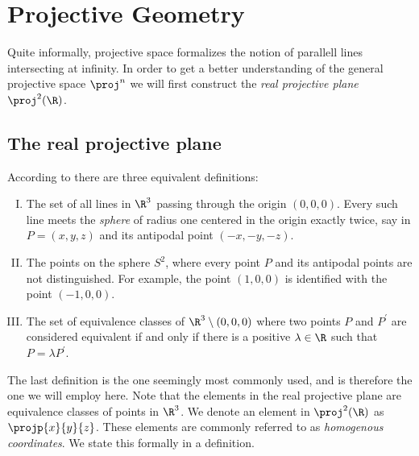\documentclass[a4paper]{article}
\begin{document}
    \section{Projective Geometry}
    \label{sec:projective_geometry}
    
    Quite informally, projective space formalizes the notion of parallell lines
    intersecting at infinity. In order to get a better understanding of the
    general projective space $\proj^n$ we will first construct the \emph{real
    projective plane} $\proj^2(\R)$. 

\subsection{The real projective plane}

    According to \cite{Wik16} there are three equivalent definitions:
    \begin{enumerate}[I.]
        \item\label{def:one} The set of all lines in $\R^3$ passing through the origin $\left( 0,
            0, 0 \right)$. Every such line meets the \emph{sphere} of radius one
            centered in the origin exactly twice, say in $P = (x, y, z)$ and its
            antipodal point $(-x, -y, -z)$.
        \item\label{def:two} The points on the sphere $S^2$, where every point $P$ and its
            antipodal points are not distinguished. For example, the point $(1, 0,
            0)$ is identified with the point $(-1, 0, 0)$.
        \item The set of equivalence classes of $\R^3 \setminus (0, 0, 0)$ where
            two points $P$ and $P^\prime$ are considered equivalent if and only if
            there is a positive $\lambda \in \R$ such that $P = \lambda P^\prime$.
    \end{enumerate}

    The last definition is the one seemingly most commonly used, and is therefore
    the one we will employ here. Note that the elements in the real projective
    plane are equivalence classes of points in $\R^3$. We denote an element in
    $\proj^2(\R)$ as $\projp{x}{y}{z}$. These elements are commonly referred to as
    \emph{homogenous coordinates}. We state this
    formally in a definition.
\end{document}
